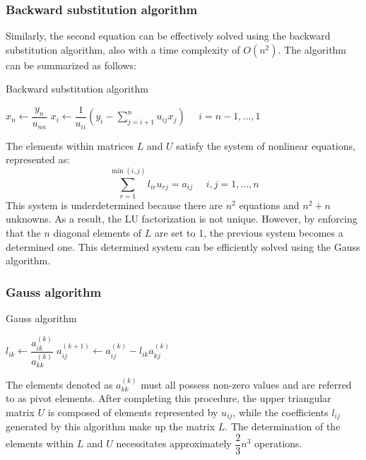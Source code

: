 \documentclass[12pt, a4paper]{report}
\begin{document}
    \subsubsection{Backward substitution algorithm}
    Similarly, the second equation can be effectively solved using the backward substitution algorithm, also with a time complexity of $O(n^2)$. 
    The algorithm can be summarized as follows:
    \begin{algorithm}[H]
        \caption{Backward substitution algorithm}
            \begin{algorithmic}
                \State $x_n\leftarrow\dfrac{y_n}{u_{nn}}$
                \State $x_i\leftarrow\dfrac{1}{u_{ii}} \left( y_i-\sum_{j=i+1}^{n}{u_{ij}x_j} \right) \:\:\:\:\:\: i=n-1,\dots,1$
            \end{algorithmic}
    \end{algorithm}

    The elements within matrices $L$ and $U$ satisfy the system of nonlinear equations, represented as:
    \[\sum_{r=1}^{\min{(i,j)}}{l_{ir}u_{rj}}=a_{ij} \:\:\:\:\:\: i,j=1,\dots,n\]
    This system is underdetermined because there are $n^2$ equations and $n^2+n$ unknowns.
    As a result, the LU factorization is not unique. 
    However, by enforcing that the $n$ diagonal elements of $L$ are set to 1, the previous system becomes a determined one.
    This determined system can be efficiently solved using the Gauss algorithm.
    \subsubsection{Gauss algorithm}
    \begin{algorithm}[H]
        \caption{Gauss algorithm}
            \begin{algorithmic}[1]
                        \State $l_{ik} \leftarrow \dfrac{a_{ik}^{(k)}}{a_{kk}^{(k)}}$
                            \State $a_{ij}^{(k+1)} \leftarrow a_{ij}^{(k)}-l_{ik}a_{kj}^{(k)}$
                        \EndFor
                    \EndFor
                \EndFor
            \end{algorithmic}
    \end{algorithm}
    The elements denoted as $a_{kk}^{(k)}$ must all possess non-zero values and are referred to as pivot elements.
    After completing this procedure, the upper triangular matrix $U$ is composed of elements represented by $u_{ij}$, while the coefficients $l_{ij}$ generated by this algorithm make up the matrix $L$.
    The determination of the elements within $L$ and $U$ necessitates approximately $\dfrac{2}{3}n^3$ operations. 
\end{document}
